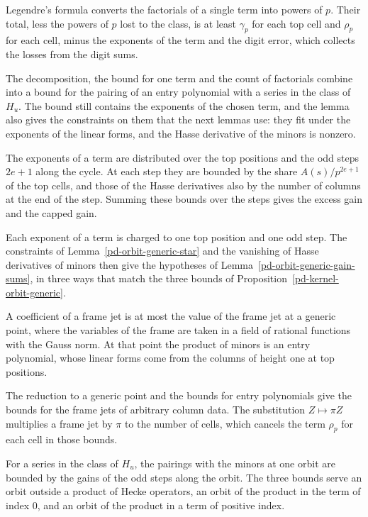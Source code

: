 Legendre's formula converts the factorials of a single term into powers of $p$. Their total, less the
powers of $p$ lost to the class, is at least $\gamma_p$ for each top cell and $\rho_p$ for each cell,
minus the exponents of the term and the digit error, which collects the losses from the digit sums.

The decomposition, the bound for one term and the count of factorials combine into a bound for the pairing
of an entry polynomial with a series in the class of $H_u$. The bound still contains the exponents of the
chosen term, and the lemma also gives the constraints on them that the next lemmas use: they fit under the
exponents of the linear forms, and the Hasse derivative of the minors is nonzero.

The exponents of a term are distributed over the top positions and the odd steps $2e+1$ along the cycle.
At each step they are bounded by the share $A(s)/p^{2e+1}$ of the top cells, and those of the Hasse
derivatives also by the number of columns at the end of the step. Summing these bounds over the steps gives
the excess gain and the capped gain.

Each exponent of a term is charged to one top position and one odd step. The constraints of
Lemma~\ref{pd-orbit-generic-star} and the vanishing of Hasse derivatives of minors then give the
hypotheses of Lemma~\ref{pd-orbit-generic-gain-sums}, in three ways that match the three bounds of
Proposition~\ref{pd-kernel-orbit-generic}.

A coefficient of a frame jet is at most the value of the frame jet at a generic point, where the variables
of the frame are taken in a field of rational functions with the Gauss norm. At that point the product of
minors is an entry polynomial, whose linear forms come from the columns of height one at top positions.

The reduction to a generic point and the bounds for entry polynomials give the bounds for the frame jets
of arbitrary column data. The substitution $Z\mapsto\pi Z$ multiplies a frame jet by $\pi$ to the number
of cells, which cancels the term $\rho_p$ for each cell in those bounds.

For a series in the class of $H_u$, the pairings with the minors at one orbit are bounded by the gains of
the odd steps along the orbit. The three bounds serve an orbit outside a product of Hecke operators, an
orbit of the product in the term of index $0$, and an orbit of the product in a term of positive index.

